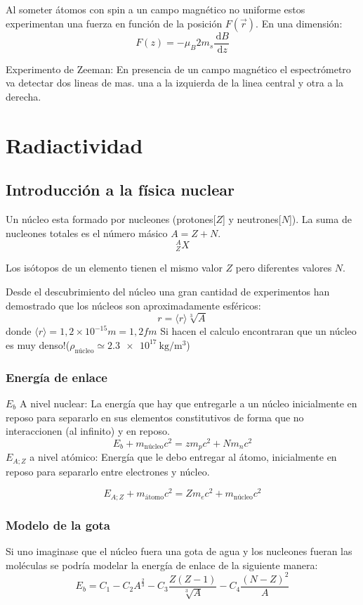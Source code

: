 \documentclass[10pt,twocolumn,titlepage]{article}
\newcommand{\di}{\,\textrm{d}}
\newcommand{\nucleo}{ {\textrm{núcleo}}}
\newcommand{\atomo}{ {\textrm{átomo}} }
\begin{document}
Al someter átomos con spin a un campo magnético no uniforme estos experimentan una fuerza en función de la posición $F(\vec{r})$. En una dimensión:
$$F(z)=-\mu_B2m_s\frac{\di B}{\di z} $$

Experimento de Zeeman: En presencia de un campo magnético el espectrómetro va detectar dos lineas de mas. una a la izquierda de la linea central y otra a la derecha.
\section{Radiactividad}
\subsection{Introducción a la física nuclear}
Un núcleo esta formado por nucleones (protones[$Z$] y neutrones[$N$]). La suma de nucleones totales es el número másico $A=Z+N$. 
$$ ^A_ZX  $$

Los isótopos de un elemento tienen el mismo valor $Z$ pero diferentes valores $N$.

Desde el descubrimiento del núcleo una gran cantidad de experimentos han demostrado que los núcleos son aproximadamente esféricos:
$$r=\langle r\rangle \sqrt[3]{A} $$
donde $\langle r \rangle=1,2\times10^{-15}\si{m}=1,2\si{fm}$
Si hacen el calculo encontraran que un núcleo es muy denso!($\rho_{\textrm{núcleo}}\simeq \SI{2,3e17}{\kg \per \meter \cubed}$)


\subsubsection*{Energía de enlace}
$E_b$ A nivel nuclear: La energía que hay que entregarle a un núcleo inicialmente en reposo para separarlo en sus elementos constitutivos de forma que no interaccionen (al infinito) y en reposo.
$$ E_b+m_{\nucleo}c^2=zm_pc^2+Nm_nc^2 $$
$E_{A;Z}$ a nivel atómico: Energía que le debo entregar al átomo, inicialmente en reposo para separarlo entre electrones y núcleo.

$$E_{A;Z}+m_{\atomo} c^2=Zm_ec^2+m_{\nucleo}c^2$$


\subsubsection*{Modelo de la gota}
Si uno imaginase que el núcleo fuera una gota de agua y los nucleones fueran las moléculas se podría modelar la energía de enlace de la siguiente manera:
$$E_b=C_1-C_2A^\frac{2}{3}-C_3\frac{Z(Z-1)}{\sqrt[3]{A}}-C_4\frac{(N-Z)^2}{A} $$
\end{document}
